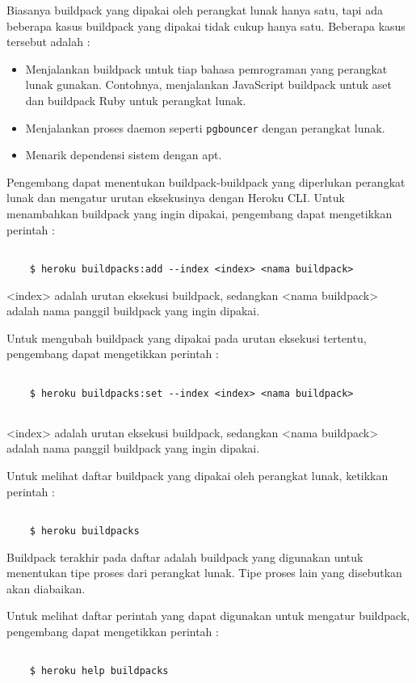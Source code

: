 Biasanya buildpack yang dipakai oleh perangkat lunak hanya satu, tapi ada beberapa kasus buildpack yang dipakai tidak cukup hanya satu. Beberapa kasus tersebut adalah :
\begin{itemize}
\item Menjalankan buildpack untuk tiap bahasa pemrograman yang perangkat lunak gunakan. Contohnya, menjalankan JavaScript buildpack untuk aset dan buildpack Ruby untuk perangkat lunak.
\item Menjalankan proses daemon seperti \texttt{pgbouncer} dengan perangkat lunak.
\item Menarik dependensi sistem dengan apt.
\end{itemize}

Pengembang dapat menentukan buildpack-buildpack yang diperlukan perangkat lunak dan mengatur urutan eksekusinya dengan Heroku CLI. Untuk menambahkan buildpack yang ingin dipakai, pengembang dapat mengetikkan perintah :
\begin{lstlisting}

	$ heroku buildpacks:add --index <index> <nama buildpack>

\end{lstlisting}
<index> adalah urutan eksekusi buildpack, sedangkan <nama buildpack> adalah nama panggil buildpack yang ingin dipakai.

Untuk mengubah buildpack yang dipakai pada urutan eksekusi tertentu, pengembang dapat mengetikkan perintah :
\begin{lstlisting}

	$ heroku buildpacks:set --index <index> <nama buildpack>
	
\end{lstlisting}
<index> adalah urutan eksekusi buildpack, sedangkan <nama buildpack> adalah nama panggil buildpack yang ingin dipakai.

Untuk melihat daftar buildpack yang dipakai oleh perangkat lunak, ketikkan perintah :
\begin{lstlisting}

	$ heroku buildpacks

\end{lstlisting}
Buildpack terakhir pada daftar adalah buildpack yang digunakan untuk menentukan tipe proses dari perangkat lunak. Tipe proses lain yang disebutkan akan diabaikan.

Untuk melihat daftar perintah yang dapat digunakan untuk mengatur buildpack, pengembang dapat mengetikkan perintah :
\begin{lstlisting}

	$ heroku help buildpacks

\end{lstlisting}

